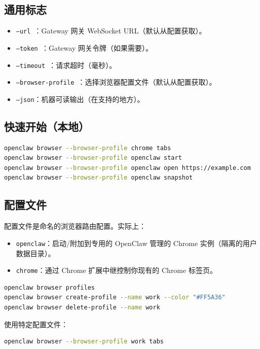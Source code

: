 \subsection{通用标志}


\begin{itemize}
  \item \texttt{--url }：Gateway 网关 WebSocket URL（默认从配置获取）。
  \item \texttt{--token }：Gateway 网关令牌（如果需要）。
  \item \texttt{--timeout }：请求超时（毫秒）。
  \item \texttt{--browser-profile }：选择浏览器配置文件（默认从配置获取）。
  \item \texttt{--json}：机器可读输出（在支持的地方）。
\end{itemize}


\subsection{快速开始（本地）}


\begin{lstlisting}[language=bash]
openclaw browser --browser-profile chrome tabs
openclaw browser --browser-profile openclaw start
openclaw browser --browser-profile openclaw open https://example.com
openclaw browser --browser-profile openclaw snapshot
\end{lstlisting}


\subsection{配置文件}


配置文件是命名的浏览器路由配置。实际上：

\begin{itemize}
  \item \texttt{openclaw}：启动/附加到专用的 OpenClaw 管理的 Chrome 实例（隔离的用户数据目录）。
  \item \texttt{chrome}：通过 Chrome 扩展中继控制你现有的 Chrome 标签页。
\end{itemize}


\begin{lstlisting}[language=bash]
openclaw browser profiles
openclaw browser create-profile --name work --color "#FF5A36"
openclaw browser delete-profile --name work
\end{lstlisting}


使用特定配置文件：

\begin{lstlisting}[language=bash]
openclaw browser --browser-profile work tabs
\end{lstlisting}


